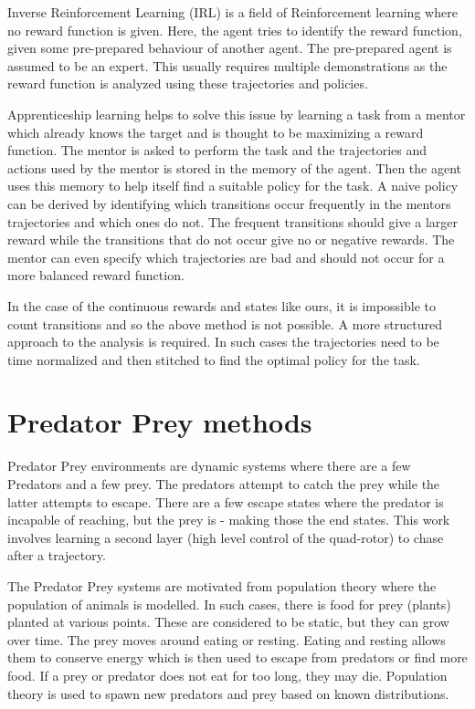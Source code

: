 \documentclass[hidelinks,BTech]{iitmdiss}
\begin{document}
Inverse Reinforcement Learning (IRL) is a field of Reinforcement learning where no reward function is given. Here, the agent tries to identify the reward function, given some pre-prepared behaviour of another agent. The pre-prepared agent is assumed to be an expert. This usually requires multiple demonstrations as the reward function is analyzed using these trajectories and policies.

Apprenticeship learning \cite{ApprenticeshipLearning} helps to solve this issue by learning a task from a mentor which already knows the target and is thought to be maximizing a reward function. The mentor is asked to perform the task and the trajectories and actions used by the mentor is stored in the memory of the agent. Then the agent uses this memory to help itself find a suitable policy for the task. A naive policy can be derived by identifying which transitions occur frequently in the mentors trajectories and which ones do not. The frequent transitions should give a larger reward while the transitions that do not occur give no or negative rewards. The mentor can even specify which trajectories are bad and should not occur for a more balanced reward function.

In the case of the continuous rewards and states like ours, it is impossible to count transitions and so the above method is not possible. A more structured approach to the analysis is required. In such cases the trajectories need to be time normalized and then stitched to find the optimal policy for the task.

\section{Predator Prey methods}

Predator Prey environments are dynamic systems where there are a few Predators and a few prey. The predators attempt to catch the prey while the latter attempts to escape. There are a few escape states where the predator is incapable of reaching, but the prey is - making those the end states. This work involves learning a second layer (high level control of the quad-rotor) to chase after a trajectory.

The Predator Prey systems are motivated from population theory \cite{PredatorPreyCoEvolution} where the population of animals is modelled. In such cases, there is food for prey (plants) planted at various points. These are considered to be static, but they can grow over time. The prey moves around eating or resting. Eating and resting allows them to conserve energy which is then used to escape from predators or find more food. If a prey or predator does not eat for too long, they may die. Population theory is used to spawn new predators and prey based on known distributions.
\end{document}
